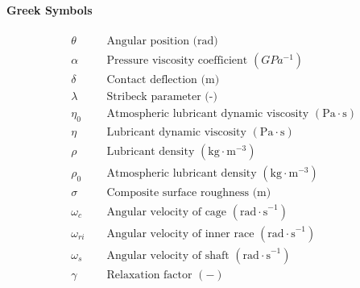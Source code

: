 \paragraph{Greek Symbols}
\begin{align*}
	&\theta && \text { Angular position (rad) } \\
	&\alpha && \text { Pressure viscosity coefficient }\left(GPa^{-1}\right) \\
	&\delta && \text { Contact deflection (m) } \\
	&\lambda && \text { Stribeck parameter (-) } \\
	&\eta_0 && \text { Atmospheric lubricant dynamic viscosity }\left(\mathrm{Pa} \cdot \mathrm{s}\right) \\
	&\eta && \text { Lubricant dynamic viscosity }\left(\mathrm{Pa} \cdot \mathrm{s}\right) \\
	&\rho && \text { Lubricant density }\left(\mathrm{kg} \cdot \mathrm{m}^{-3} \right) \\
	&\rho_0 && \text { Atmospheric lubricant density }\left(\mathrm{kg} \cdot \mathrm{m}^{-3} \right) \\
	&\sigma && \text { Composite surface roughness (m) } \\
	&\omega_c && \text { Angular velocity of cage }\left(\mathrm{rad \cdot s}^{-1}\right) \\
	&\omega_{r i} && \text { Angular velocity of inner race }\left(\mathrm{rad \cdot s}^{-1}\right) \\
	&\omega_s && \text { Angular velocity of shaft }\left(\mathrm{rad \cdot s}^{-1}\right) \\
	&\gamma && \text { Relaxation factor }(-) \\
\end{align*}


